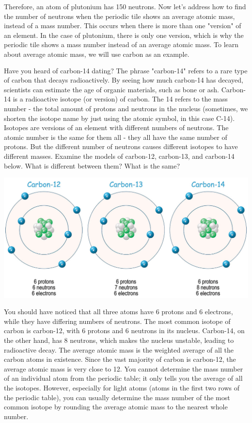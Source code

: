 Therefore, an atom of plutonium has 150 neutrons. Now let's address how to find
the number of neutrons when the periodic tile shows an average atomic mass, 
instead of a mass number. This occurs when there is more than one "version" of 
an element. In the case of plutonium, there is only one version, which is why 
the periodic tile shows a mass number instead of an average atomic mass. To 
learn about average atomic mass, we will use carbon as an example. 

Have you heard of carbon-14 dating? The phrase "carbon-14" refers to a rare
type of carbon that decays radioactively. By seeing how much carbon-14 has
decayed, scientists can estimate the age of organic materials, such as bone or
ash. Carbon-14 is a radioactive isotope (or version) of carbon. The 14 refers to
the mass number - the total amount of protons and neutrons in the nucleus 
(sometimes, we shorten the isotope name by just using the atomic symbol, in 
this case C-14). Isotopes are versions of an element with different numbers of 
neutrons. The atomic number is the same for them all - they all have the same 
number of protons. But the different number of neutrons causes different 
isotopes to have different masses. Examine the models of carbon-12, carbon-13, 
and carbon-14 below. What is different between them? What is the same?

\begin{center}
\includegraphics[scale=0.35]{carbon_iso.png}
\end{center}

You should have noticed that all three atoms have 6 protons and 6 electrons, 
while they have differing numbers of neutrons. The most common isotope of carbon 
is carbon-12, with 6 protons and 6 neutrons in its nucleus. Carbon-14, on the 
other hand, has 8 neutrons, which makes the nucleus unstable, leading to 
radioactive decay. The average atomic mass 
is the weighted average of all the carbon atoms in existence. Since the vast
majority of carbon is carbon-12, the average atomic mass is very close to 12. 
You cannot determine the mass number of an individual atom from the periodic 
table; it only tells you the average of all the isotopes. However, especially 
for light atoms (atoms in the first two rows of the periodic table), you can 
usually determine the mass number of the most common isotope by rounding the 
average atomic mass to the nearest whole number.

